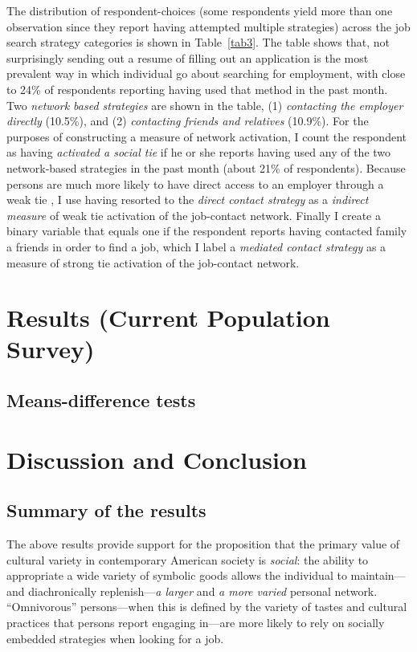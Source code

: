 \documentclass[12pt]{article}
\begin{document}
The distribution of respondent-choices (some respondents yield more than one observation since they report having attempted multiple strategies) across the job search strategy categories is shown in Table~\ref{tab3}. The table shows that, not surprisingly sending out a resume of filling out an application is the most prevalent way in which individual go about searching for employment, with close to 24\% of respondents reporting having used that method in the past month.  Two \emph{network based strategies} are shown in the table, (1) \emph{contacting the employer directly} (10.5\%), and (2) \emph{contacting friends and relatives} (10.9\%). For the purposes of constructing a measure of network activation,  I count the respondent as having \emph{activated a social tie} if he or she reports having used any of the two network-based strategies in the past month (about 21\% of respondents). Because persons are much more likely to have direct access to an employer through a weak tie \citep{yakubovich05}, I use having resorted to the \emph{direct contact strategy} as a \emph{indirect measure} of weak tie activation of the job-contact network. Finally I create a binary variable that equals one if the respondent reports having contacted family a friends in order to find a job, which I label a \emph{mediated contact strategy} as a measure of strong tie activation of the job-contact network.



\section{Results (Current Population Survey)}
\subsection{Means-difference tests}

\section{Discussion and Conclusion}
\subsection{Summary of the results}
The above results provide support for the proposition that the primary value of cultural variety in contemporary American society is \emph{social}: the ability to appropriate a wide variety of symbolic goods allows the individual to maintain---and diachronically replenish---\emph{a larger }and \emph{a more varied} personal network.   ``Omnivorous'' persons---when this is defined by the variety of tastes and cultural practices that persons report engaging in---are more likely to rely on socially embedded strategies when looking for a job.
\end{document}

